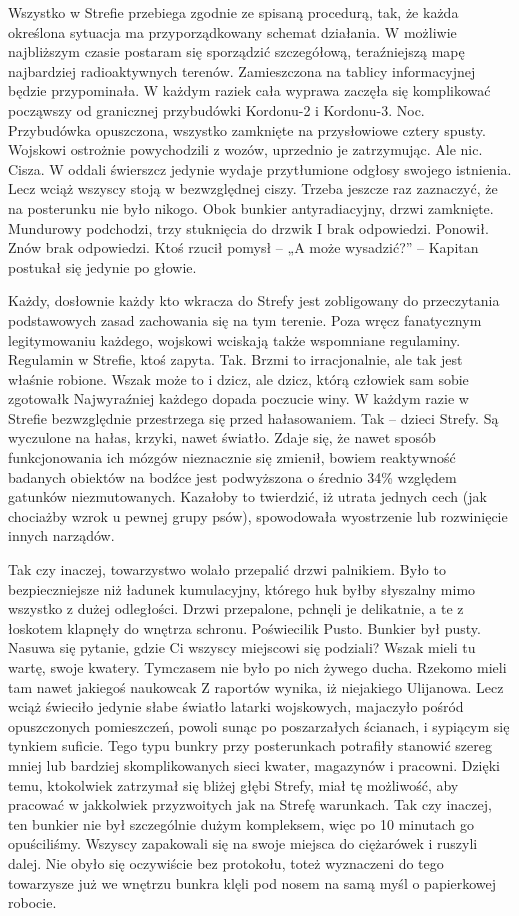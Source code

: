\documentclass[../MAIN.tex]{subfiles}
\begin{document}
Wszystko w Strefie przebiega zgodnie ze spisaną procedurą, tak, że każda określona sytuacja ma przyporządkowany schemat działania. W możliwie najbliższym czasie postaram się sporządzić szczegółową, teraźniejszą mapę najbardziej radioaktywnych terenów. Zamieszczona na tablicy informacyjnej będzie przypominała. W każdym razie\3k cała wyprawa zaczęła się komplikować począwszy od granicznej przybudówki Kordonu-2 i Kordonu-3.
% 
Noc. Przybudówka opuszczona, wszystko zamknięte na przysłowiowe cztery spusty. Wojskowi ostrożnie powychodzili z wozów, uprzednio je zatrzymując. Ale nic. Cisza. W oddali świerszcz jedynie wydaje przytłumione odgłosy swojego istnienia. Lecz wciąż wszyscy stoją w bezwzględnej ciszy. Trzeba jeszcze raz zaznaczyć, że na posterunku nie było nikogo. Obok bunkier antyradiacyjny, drzwi zamknięte. Mundurowy podchodzi, trzy stuknięcia do drzwi\3k I brak odpowiedzi. Ponowił. Znów brak odpowiedzi. Ktoś rzucił pomysł -- „A może wysadzić?” -- Kapitan postukał się jedynie po głowie.

Każdy, dosłownie każdy kto wkracza do Strefy jest zobligowany do przeczytania podstawowych zasad zachowania się na tym terenie. Poza wręcz fanatycznym legitymowaniu każdego, wojskowi wciskają także wspomniane regulaminy. Regulamin w Strefie, ktoś zapyta. Tak. Brzmi to irracjonalnie, ale tak jest właśnie robione. Wszak może to i dzicz, ale dzicz, którą człowiek sam sobie zgotował\3k Najwyraźniej każdego dopada poczucie winy. W każdym razie w Strefie bezwzględnie przestrzega się przed hałasowaniem. Tak -- dzieci Strefy. Są wyczulone na hałas, krzyki, nawet światło. Zdaje się, że nawet sposób funkcjonowania ich mózgów nieznacznie się zmienił, bowiem reaktywność badanych obiektów na bodźce jest podwyższona o średnio 34\% względem gatunków niezmutowanych. Kazałoby to twierdzić, iż utrata jednych cech (jak chociażby wzrok u pewnej grupy psów), spowodowała wyostrzenie lub rozwinięcie innych narządów.

Tak czy inaczej, towarzystwo wolało przepalić drzwi palnikiem. Było to bezpieczniejsze niż ładunek kumulacyjny, którego huk byłby słyszalny mimo wszystko z dużej odległości. Drzwi przepalone, pchnęli je delikatnie, a te z łoskotem klapnęły do wnętrza schronu. Poświecili\3k Pusto. Bunkier był pusty. Nasuwa się pytanie, gdzie Ci wszyscy miejscowi się podziali? Wszak mieli tu wartę, swoje kwatery. Tymczasem nie było po nich żywego ducha. Rzekomo mieli tam nawet jakiegoś naukowca\3k Z raportów wynika, iż niejakiego Ulijanowa. Lecz wciąż świeciło jedynie słabe światło latarki wojskowych, majaczyło pośród opuszczonych pomieszczeń, powoli sunąc po poszarzałych ścianach, i sypiącym się tynkiem suficie. Tego typu bunkry przy posterunkach potrafiły stanowić szereg mniej lub bardziej skomplikowanych sieci kwater, magazynów i pracowni. Dzięki temu, ktokolwiek zatrzymał się bliżej głębi Strefy, miał tę możliwość, aby pracować w jakkolwiek przyzwoitych jak na Strefę warunkach. Tak czy inaczej, ten bunkier nie był 
szczególnie 
dużym kompleksem, więc po 10 minutach go opuściliśmy. Wszyscy zapakowali się na swoje miejsca do ciężarówek i ruszyli dalej. Nie obyło się oczywiście bez protokołu, toteż wyznaczeni do tego towarzysze już we wnętrzu bunkra klęli pod nosem na samą myśl o papierkowej robocie.
\end{document}
